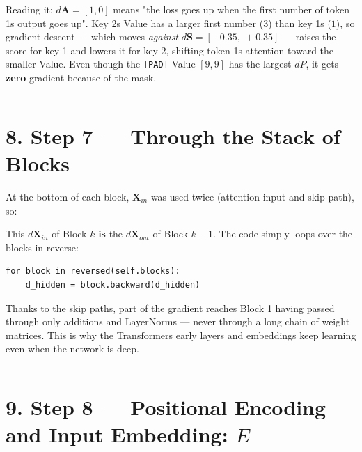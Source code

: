 \documentclass[11pt,a4paper,oneside]{report}
\begin{document}
Reading it: \(d\mathbf{A} = [1, 0]\) means "the loss goes up when the first number of token 1\textquotesingle s output goes up". Key 2\textquotesingle s Value has a larger first number (\(3\)) than key 1\textquotesingle s (\(1\)), so gradient descent --- which moves \emph{against} \(d\mathbf{S} = [-0.35,\ +0.35]\) --- raises the score for key 1 and lowers it for key 2, shifting token 1\textquotesingle s attention toward the smaller Value. Even though the \texttt{{[}PAD{]}} Value \([9, 9]\) has the largest \(dP\), it gets \textbf{zero} gradient because of the mask.

\begin{center}\rule{0.5\linewidth}{0.5pt}\end{center}

\section{8. Step 7 --- Through the Stack of Blocks}\label{8-step-7--through-the-stack-of-blocks}

At the bottom of each block, \(\mathbf{X}_{in}\) was used twice (attention input and skip path), so:

\begin{center}\end{center}

This \(d\mathbf{X}_{in}\) of Block \(k\) \textbf{is} the \(d\mathbf{X}_{out}\) of Block \(k - 1\). The code simply loops over the blocks in reverse:

\begin{Verbatim}[fontsize=\small]
for block in reversed(self.blocks):
    d_hidden = block.backward(d_hidden)
\end{Verbatim}

Thanks to the skip paths, part of the gradient reaches Block 1 having passed through only additions and LayerNorms --- never through a long chain of weight matrices. This is why the Transformer\textquotesingle s early layers and embeddings keep learning even when the network is deep.

\begin{center}\rule{0.5\linewidth}{0.5pt}\end{center}

\section{\texorpdfstring{9. Step 8 --- Positional Encoding and Input Embedding: \(E\)}{9. Step 8 --- Positional Encoding and Input Embedding: E}}\label{9-step-8--positional-encoding-and-input-embedding-e}
\end{document}
